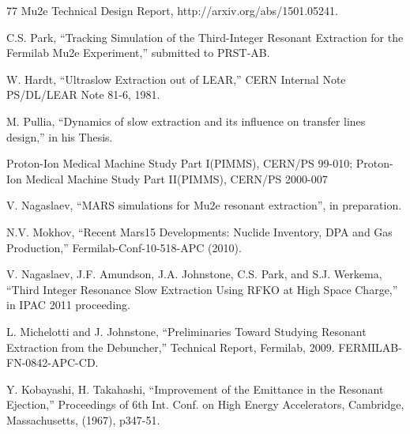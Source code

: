 \documentclass[review,1p,number,fleqn,a4paper]{elsarticle}
\begin{document}
\begin{thebibliography}{77}
  Mu2e Technical Design Report, http://arxiv.org/abs/1501.05241.

  C.S. Park, ``Tracking Simulation of the Third-Integer Resonant Extraction for the Fermilab Mu2e Experiment,'' submitted to PRST-AB.

  W. Hardt, ``Ultraslow Extraction out of LEAR,'' CERN Internal Note PS/DL/LEAR Note 81-6, 1981.

  M. Pullia, ``Dynamics of slow extraction and its influence on transfer lines design,'' in his Thesis.

  Proton-Ion Medical Machine Study Part I(PIMMS), CERN/PS 99-010; Proton-Ion Medical Machine Study Part II(PIMMS), CERN/PS 2000-007


  V. Nagaslaev, ``MARS simulations for Mu2e resonant extraction'', in preparation.

  N.V. Mokhov, ``Recent Mars15 Developments: Nuclide Inventory, DPA and Gas Production,'' Fermilab-Conf-10-518-APC (2010).

  V. Nagaslaev, J.F. Amundson, J.A. Johnstone, C.S. Park, and S.J. Werkema,  ``Third Integer Resonance Slow Extraction Using RFKO at High Space Charge,'' in  IPAC 2011 proceeding.

  L. Michelotti and J. Johnstone, ``Preliminaries Toward Studying Resonant Extraction from the Debuncher,'' Technical Report, Fermilab, 2009. FERMILAB-FN-0842-APC-CD.

  Y. Kobayashi, H. Takahashi, ``Improvement of the Emittance in the Resonant Ejection,'' Proceedings of 6th Int. Conf. on High Energy Accelerators, Cambridge, Massachusetts, (1967), p347-51.


\end{thebibliography}
\end{document}

